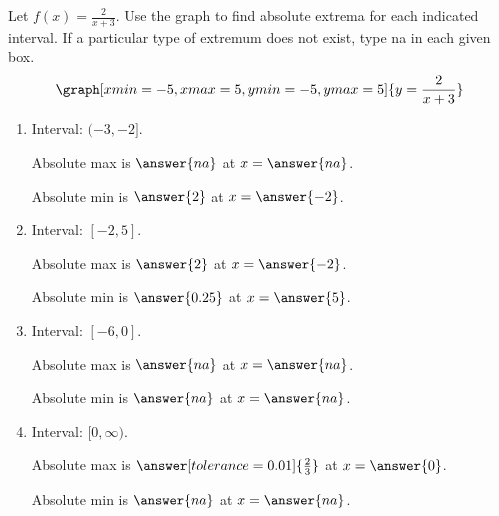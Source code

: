 \documentclass{ximera}
\begin{document}
\begin{problem}\label{prob:240quiz13prob1}
Let $f(x)=\frac{2}{x+3}$.  Use the graph to find absolute extrema for each indicated interval.  If a particular type of extremum does not exist, type na in each given box.
\[
\graph[xmin=-5,xmax=5,ymin=-5,ymax=5]{y=\frac{2}{x+3}} 
\]

\begin{enumerate}
    \item Interval: $(-3, -2]$.
    
    Absolute max is $\answer{na}$ at $x=\answer{na}$.
    
    Absolute min is $\answer{2}$ at $x=\answer{-2}$.
    
    \item Interval: $[-2, 5]$.
    
    Absolute max is $\answer{2}$ at $x=\answer{-2}$.
    
    Absolute min is $\answer{0.25}$ at $x=\answer{5}$.
    
    \item Interval: $[-6, 0]$.
    
    Absolute max is $\answer{na}$ at $x=\answer{na}$.
    
    Absolute min is $\answer{na}$ at $x=\answer{na}$.
    
    \item Interval: $[0, \infty)$.
    
    Absolute max is $\answer[tolerance=0.01]{\frac{2}{3}}$ at $x=\answer{0}$.
    
    Absolute min is $\answer{na}$ at $x=\answer{na}$.
\end{enumerate}
\end{problem}
\end{document}

